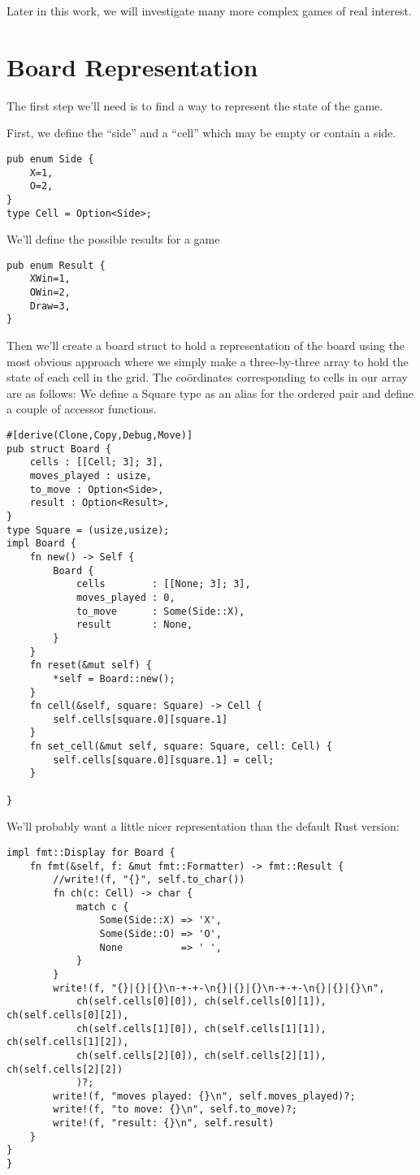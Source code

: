 \documentclass[10pt,dvipdfmx]{report}
\newcommand{\g}[1]{{\sc{#1}}\index{{\sc{#1}}}}
\begin{document}
Later in this work, we will investigate many more complex games of real interest.

\section{Board Representation}
The first step we'll need is to find a way to represent the state of the game.

First, we define the ``side'' and a ``cell'' which may be empty or contain a side.
{\scriptsize
\begin{verbatim}
pub enum Side {
    X=1,
    O=2,
}
type Cell = Option<Side>;
\end{verbatim}
}

We'll define the possible results for a game
{\scriptsize
\begin{verbatim}
pub enum Result {
    XWin=1,
    OWin=2,
    Draw=3,
}
\end{verbatim}}

Then we'll create a board struct to hold a representation of the board using
the most obvious approach where we simply make a three-by-three array to hold the
state of each cell in the \g{tic-tac-toe} grid.  The co\"ordinates corresponding to cells in our array
are as follows:
{\tiny{}}
We define a Square type as an alias for the ordered pair and define a couple of accessor functions.
{\scriptsize\begin{verbatim}
#[derive(Clone,Copy,Debug,Move)]
pub struct Board {
    cells : [[Cell; 3]; 3],
    moves_played : usize,
    to_move : Option<Side>,
    result : Option<Result>,
}
type Square = (usize,usize);
impl Board {
    fn new() -> Self {
        Board {
            cells        : [[None; 3]; 3],
            moves_played : 0,
            to_move      : Some(Side::X),
            result       : None,
        }
    }
    fn reset(&mut self) {
        *self = Board::new();
    }
    fn cell(&self, square: Square) -> Cell {
        self.cells[square.0][square.1]
    }
    fn set_cell(&mut self, square: Square, cell: Cell) {
        self.cells[square.0][square.1] = cell;
    }

}
\end{verbatim}}
We'll probably want a little nicer representation than the default Rust version:
{\scriptsize\begin{verbatim}
impl fmt::Display for Board {
    fn fmt(&self, f: &mut fmt::Formatter) -> fmt::Result {
        //write!(f, "{}", self.to_char())
        fn ch(c: Cell) -> char {
            match c {
                Some(Side::X) => 'X',
                Some(Side::O) => 'O',
                None          => ' ',
            }
        }
        write!(f, "{}|{}|{}\n-+-+-\n{}|{}|{}\n-+-+-\n{}|{}|{}\n",
            ch(self.cells[0][0]), ch(self.cells[0][1]), ch(self.cells[0][2]),
            ch(self.cells[1][0]), ch(self.cells[1][1]), ch(self.cells[1][2]),
            ch(self.cells[2][0]), ch(self.cells[2][1]), ch(self.cells[2][2])
            )?;
        write!(f, "moves played: {}\n", self.moves_played)?;
        write!(f, "to move: {}\n", self.to_move)?;
        write!(f, "result: {}\n", self.result)
    }
}
}
\end{verbatim}}
\end{document}
